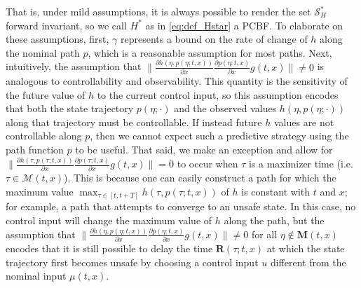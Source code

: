 \documentclass[10pt,conference]{ieeeconf}
\renewcommand{\(}{\left(}
\renewcommand{\)}{\right)}
\renewcommand{\[}{\left[}
\renewcommand{\]}{\right]}
\begin{document}
That is, under mild assumptions, it is always possible to render the set $\mathcal{S}_H^*$ forward invariant, so we call $H^*$ as in \eqref{eq:def_Hstar} a PCBF. To elaborate on these assumptions, {first, $\gamma$ represents a bound on the rate of change of $h$ along the nominal path $p$, which is a reasonable assumption for most paths. Next,} intuitively, the assumption that $\| \frac{\partial h(\eta, p(\eta; t,x))}{\partial x}\frac{\partial p(\eta; t,x)}{\partial x} g(t,x) \| \neq 0$ is analogous to controllability and observability. 
This quantity is the sensitivity of the future value of $h$ to the current control input, so this assumption encodes that both the state trajectory $p(\eta;\cdot)$ and the observed values $h(\eta,p(\eta;\cdot))$ along that trajectory must be controllable.
If instead {future} $h$ {values are} not controllable along $p$, then we cannot expect such a predictive strategy using the path function $p$ to be useful. That said, we make an exception and allow for $\| \frac{\partial h(\tau, p(\tau; t,x))}{\partial x}\frac{\partial p(\tau; t,x)}{\partial x} g(t,x) \| = 0$ to occur when $\tau$ is a maximizer time {(i.e. $\tau\in\mathscr{M}(t,x)$)}. This is because one can easily construct a path for which the maximum value $\max_{\tau \in [t,t+T]}h(\tau,p(\tau;t,x))$ of $h$ is constant with $t$ and $x$; for example, a path that attempts to converge to an unsafe state. In this case, no control input will change the maximum value of $h$ along the path, but the assumption that $\| \frac{\partial h(\eta, p(\eta; t,x))}{\partial x}\frac{\partial p(\eta; t,x)}{\partial x} g(t,x) \| \neq 0$ for all $\eta \notin \boldsymbol{M}(t,x)$ encodes that it is still possible to delay the time $\boldsymbol{R}(\tau;t,x)$ at which the state trajectory first becomes unsafe by choosing a control input $u$ different from the nominal input $\mu(t,x)$.
\end{document}
